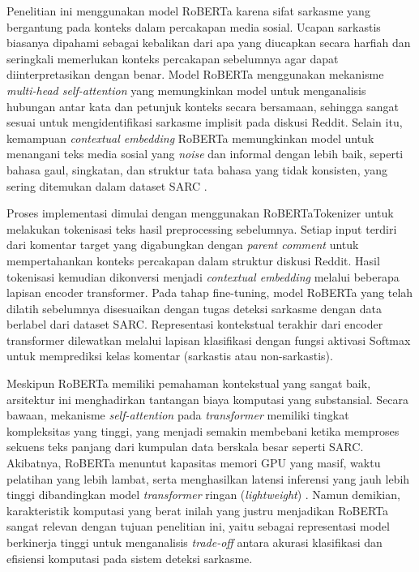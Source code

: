 Penelitian ini menggunakan model RoBERTa karena sifat sarkasme yang bergantung pada konteks dalam percakapan media sosial. Ucapan sarkastis biasanya dipahami sebagai kebalikan dari apa yang diucapkan secara harfiah dan seringkali memerlukan konteks percakapan sebelumnya agar dapat diinterpretasikan dengan benar. Model RoBERTa menggunakan mekanisme \textit{multi-head self-attention} yang memungkinkan model untuk menganalisis hubungan antar kata dan petunjuk konteks secara bersamaan, sehingga sangat sesuai untuk mengidentifikasi sarkasme implisit pada diskusi Reddit. Selain itu, kemampuan \textit{contextual embedding} RoBERTa memungkinkan model untuk menangani teks media sosial yang \textit{noise} dan informal dengan lebih baik, seperti bahasa gaul, singkatan, dan struktur tata bahasa yang tidak konsisten, yang sering ditemukan dalam dataset SARC \cite{dubey2025unpacking, jimenez2026bert}.

Proses implementasi dimulai dengan menggunakan RoBERTaTokenizer untuk melakukan tokenisasi teks hasil preprocessing sebelumnya. Setiap input terdiri dari komentar target yang digabungkan dengan \textit{parent comment} untuk mempertahankan konteks percakapan dalam struktur diskusi Reddit. Hasil tokenisasi kemudian dikonversi menjadi \textit{contextual embedding} melalui beberapa lapisan encoder transformer. Pada tahap fine-tuning, model RoBERTa yang telah dilatih sebelumnya disesuaikan dengan tugas deteksi sarkasme dengan data berlabel dari dataset SARC. Representasi kontekstual terakhir dari encoder transformer dilewatkan melalui lapisan klasifikasi dengan fungsi aktivasi Softmax untuk memprediksi kelas komentar (sarkastis atau non-sarkastis).

Meskipun RoBERTa memiliki pemahaman kontekstual yang sangat baik, arsitektur ini menghadirkan tantangan biaya komputasi yang substansial. Secara bawaan, mekanisme \textit{self-attention} pada \textit{transformer} memiliki tingkat kompleksitas yang tinggi, yang menjadi semakin membebani ketika memproses sekuens teks panjang dari kumpulan data berskala besar seperti SARC. Akibatnya, RoBERTa menuntut kapasitas memori GPU yang masif, waktu pelatihan yang lebih lambat, serta menghasilkan latensi inferensi yang jauh lebih tinggi dibandingkan model \textit{transformer} ringan (\textit{lightweight}) \cite{dubey2025unpacking}. Namun demikian, karakteristik komputasi yang berat inilah yang justru menjadikan RoBERTa sangat relevan dengan tujuan penelitian ini, yaitu sebagai representasi model berkinerja tinggi untuk menganalisis \textit{trade-off} antara akurasi klasifikasi dan efisiensi komputasi pada sistem deteksi sarkasme.

